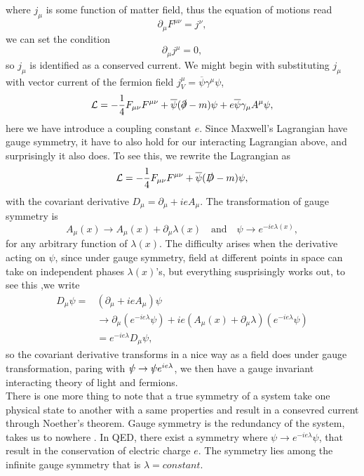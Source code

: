 \documentclass{report}
\newcommand{\nn}{\nonumber}
\numberwithin{equation}{section}
\begin{document}
where $j_\mu$ is some function of matter field, thus the equation of motions read
\begin{equation}
    \partial_\mu F^{\mu\nu}=j^\nu,
\end{equation}
we can set the condition
\begin{equation}
    \partial_\mu j^\mu=0,
\end{equation}
so $j_\mu$ is identified as a conserved current. We might begin with substituting $j_\mu$ with vector current of the fermion field $j^\mu_V=\overline{\psi} \gamma^\mu \psi$,
\begin{equation}
    \mathcal{L}=-\frac{1}{4}F_{\mu\nu}F^{\mu\nu}+\overline{\psi}(\slashed{\partial}-m) \psi+ e\overline{\psi} \gamma_\mu A^\mu \psi,
\end{equation}
here we have introduce a coupling constant $e$. Since Maxwell's Lagrangian have gauge symmetry, it have to also hold for our interacting Lagrangian above, and surprisingly it also does. To see this, we rewrite the Lagrangian as
\begin{equation}
        \mathcal{L}=-\frac{1}{4}F_{\mu\nu}F^{\mu\nu}+\overline{\psi}(\slashed{D}-m) \psi,
\end{equation}
with the covariant derivative $D_\mu=\partial_\mu+ ie  A_\mu $. The transformation of gauge symmetry is
\begin{equation}
    A_\mu(x)\rightarrow A_\mu(x) +\partial_\mu \lambda(x) \quad \text{and} \quad \psi\rightarrow e^{-ie\lambda(x)},
\end{equation}
for any arbitrary function of $\lambda(x)$. The difficulty arises when the derivative acting on $\psi$, since under gauge symmetry, field at different points in space can take on independent phases $\lambda(x)$'s, but everything susprisingly works out, to see this ,we write
\begin{align}
    D_\mu \psi=&(\partial_\mu+ ie  A_\mu) \psi\nn\\
   &\rightarrow \partial_\mu (e^{-ie\lambda}\psi)+ ie (A_\mu(x) +\partial_\mu \lambda) (e^{-ie\lambda}\psi)\nn\\
   &=e^{-ie\lambda} D_\mu \psi,
\end{align}
so the covariant derivative transforms in a nice way as a field does under gauge transformation, paring with $\slashed{\psi}\rightarrow \slashed{\psi}e^{ie\lambda}$, we then have a gauge invariant interacting theory of light and fermions.\\
There is one more thing to note that a true symmetry of a system take one physical state to another with a same properties and result in a consevred current through Noether's theorem.  Gauge symmetry is the redundancy of the system, takes us to nowhere . In QED, there exist a symmetry where $\psi\rightarrow e^{-ie\lambda}\psi$, that result in the conservation of electric charge $e$. The symmetry lies among the infinite gauge symmetry that is $\lambda=constant$.
\end{document}
